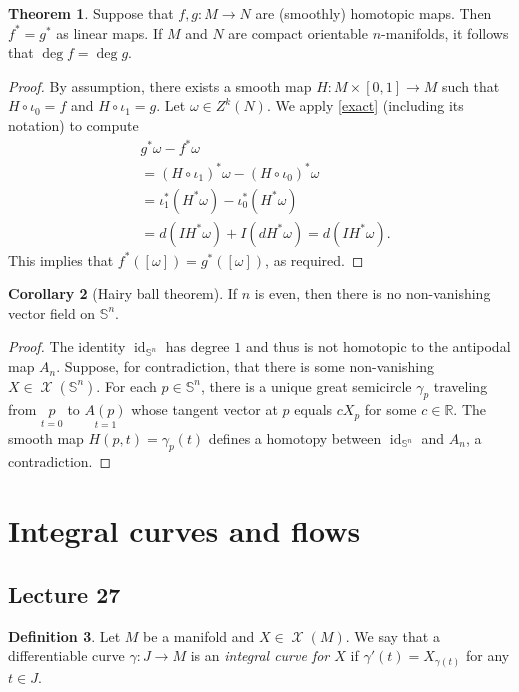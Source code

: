 \documentclass[10pt,letterpaper,cm]{nupset}
\theoremstyle{definition}
\newtheorem{definition}{Definition}[subsection]
\theoremstyle{theorem}
\newtheorem{theorem}[definition]{Theorem}
\newtheorem{corollary}[definition]{Corollary}
\theoremstyle{remark}
\newcommand{\R}{\mathbb R}
\renewcommand{\S}{\mathbb S}
\newcommand{\1}{\mathbf{1}}
\newcommand{\0}{\vec 0}
\DeclareMathOperator{\id}{id}
\DeclareMathOperator{\vf}{\mathscr{X}}
\begin{document}
\begin{theorem}
Suppose that $f,g: M \to N$ are (smoothly) homotopic maps. Then $f^{\ast} = g^{\ast}$ as linear maps. If $M$ and $N$ are compact orientable $n$-manifolds, it follows that $\deg f= \deg g$.
\end{theorem}
\begin{proof}
By assumption, there exists a smooth map $H: M \times [0,1] \to M$ such that $H \circ \iota_0 =f$ and $H \circ \iota_1 = g$. Let $\omega \in Z^k(N)$. We apply \cref{exact} (including its notation) to compute
\begin{align*}
& g^{\ast} \omega - f^{\ast} \omega 
\\ & = (H \circ \iota_1)^{\ast} \omega - (H \circ \iota_0)^{\ast} \omega
\\ & = \iota_1^{\ast} (H^{\ast} \omega) -  \iota_0^{\ast} (H^{\ast} \omega)
\\ & = d(IH^{\ast}\omega)+I(dH^{\ast}\omega) = d(IH^{\ast}\omega).
\end{align*} 
This implies that $f^{\ast}([\omega]) = g^{\ast}([\omega])$, as required. 
\end{proof}

\begin{corollary}[Hairy ball theorem]\label{hbt}
If $n$ is even, then there is no non-vanishing vector field on $\S^n$.
\end{corollary}
\begin{proof}
The identity $\id_{\S^n}$ has degree $1$ and thus is not homotopic to the antipodal map $A_n$. Suppose, for contradiction, that there is some non-vanishing $X\in \vf(\S^n)$. For each $p\in \S^n$, there is a unique great semicircle $\gamma_p$ traveling from $\underset{t=0}{p}$ to $\underset{t=1}{A(p)}$ whose tangent vector at $p$ equals $c X_p$ for some $c\in \R$. The smooth map $H(p, t) =\gamma_p(t)$ defines a homotopy between $\id_{\S^n}$  and $A_n$, a contradiction. 
\end{proof}

\section{Integral curves and flows}

\subsection{Lecture 27}

\begin{definition}
Let $M$ be a manifold and $X\in \vf(M)$. We say that a differentiable curve $\gamma : J \to M$ is an \textit{integral curve for $X$} if $\gamma'(t) = X_{\gamma(t)}$ for any $t\in J$.
\end{definition}
\end{document}
